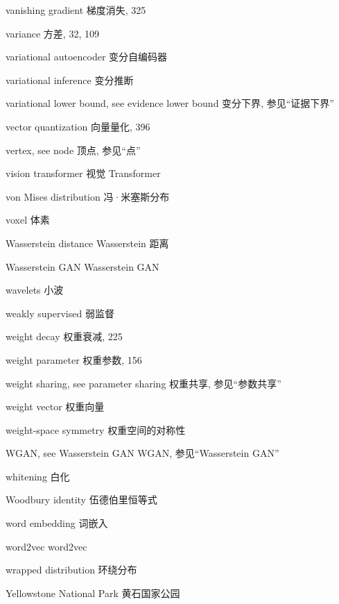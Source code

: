 vanishing gradient  梯度消失, 325 \par
variance  方差, 32, 109 \par
variational autoencoder  变分自编码器 \par
variational inference  变分推断 \par
variational lower bound, see evidence lower bound  变分下界, 参见“证据下界” \par
vector quantization  向量量化, 396 \par
vertex, see node  顶点, 参见“点” \par
vision transformer  视觉 Transformer \par
von Mises distribution  冯·米塞斯分布 \par
voxel  体素 \par
Wasserstein distance  Wasserstein 距离 \par
Wasserstein GAN  Wasserstein GAN \par
wavelets  小波 \par
weakly supervised  弱监督 \par
weight decay  权重衰减, 225 \par
weight parameter  权重参数, 156 \par
weight sharing, see parameter sharing  权重共享, 参见“参数共享” \par
weight vector  权重向量 \par
weight-space symmetry  权重空间的对称性 \par
WGAN, see Wasserstein GAN  WGAN, 参见“Wasserstein GAN” \par
whitening  白化 \par
Woodbury identity  伍德伯里恒等式 \par
word embedding  词嵌入 \par
word2vec  word2vec \par
wrapped distribution  环绕分布 \par
Yellowstone National Park  黄石国家公园 \par

